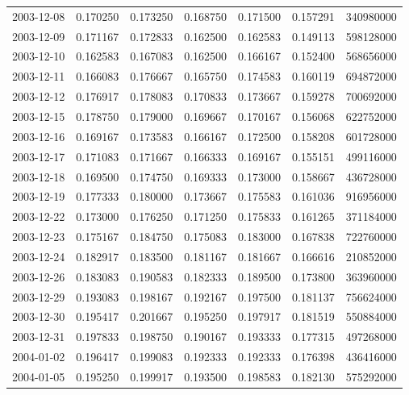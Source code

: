 \begin{tabular}{lrrrrrr}
2003-12-08 &    0.170250 &    0.173250 &    0.168750 &    0.171500 &    0.157291 &   340980000 \\
2003-12-09 &    0.171167 &    0.172833 &    0.162500 &    0.162583 &    0.149113 &   598128000 \\
2003-12-10 &    0.162583 &    0.167083 &    0.162500 &    0.166167 &    0.152400 &   568656000 \\
2003-12-11 &    0.166083 &    0.176667 &    0.165750 &    0.174583 &    0.160119 &   694872000 \\
2003-12-12 &    0.176917 &    0.178083 &    0.170833 &    0.173667 &    0.159278 &   700692000 \\
2003-12-15 &    0.178750 &    0.179000 &    0.169667 &    0.170167 &    0.156068 &   622752000 \\
2003-12-16 &    0.169167 &    0.173583 &    0.166167 &    0.172500 &    0.158208 &   601728000 \\
2003-12-17 &    0.171083 &    0.171667 &    0.166333 &    0.169167 &    0.155151 &   499116000 \\
2003-12-18 &    0.169500 &    0.174750 &    0.169333 &    0.173000 &    0.158667 &   436728000 \\
2003-12-19 &    0.177333 &    0.180000 &    0.173667 &    0.175583 &    0.161036 &   916956000 \\
2003-12-22 &    0.173000 &    0.176250 &    0.171250 &    0.175833 &    0.161265 &   371184000 \\
2003-12-23 &    0.175167 &    0.184750 &    0.175083 &    0.183000 &    0.167838 &   722760000 \\
2003-12-24 &    0.182917 &    0.183500 &    0.181167 &    0.181667 &    0.166616 &   210852000 \\
2003-12-26 &    0.183083 &    0.190583 &    0.182333 &    0.189500 &    0.173800 &   363960000 \\
2003-12-29 &    0.193083 &    0.198167 &    0.192167 &    0.197500 &    0.181137 &   756624000 \\
2003-12-30 &    0.195417 &    0.201667 &    0.195250 &    0.197917 &    0.181519 &   550884000 \\
2003-12-31 &    0.197833 &    0.198750 &    0.190167 &    0.193333 &    0.177315 &   497268000 \\
2004-01-02 &    0.196417 &    0.199083 &    0.192333 &    0.192333 &    0.176398 &   436416000 \\
2004-01-05 &    0.195250 &    0.199917 &    0.193500 &    0.198583 &    0.182130 &   575292000 \\

\end{tabular}
